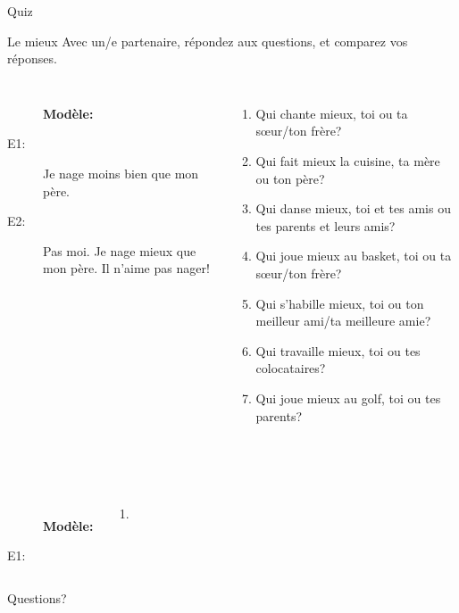 \documentclass{beamer}
\begin{document}
  \begin{frame}{}
    \begin{center}
      \Large Quiz
    \end{center}
  \end{frame}

  \begin{frame}{Le mieux}
    Avec un/e partenaire, répondez aux questions, et comparez vos réponses. \\
    \begin{columns}
        \begin{description}
          \item[] \textbf{Modèle:}
          \item[] 
          \item[E1:] Je nage moins bien que mon père.
          \item[E2:] Pas moi. Je nage mieux que mon père. Il n'aime pas nager!
        \end{description}
        \begin{enumerate}
          \item Qui chante mieux, toi ou ta sœur/ton frère?
          \item Qui fait mieux la cuisine, ta mère ou ton père?
          \item Qui danse mieux, toi et tes amis ou tes parents et leurs amis?
          \item Qui joue mieux au basket, toi ou ta sœur/ton frère?
          \item Qui s'habille mieux, toi ou ton meilleur ami/ta meilleure amie?
          \item Qui travaille mieux, toi ou tes colocataires?
          \item Qui joue mieux au golf, toi ou tes parents?
        \end{enumerate}
    \end{columns}
  \end{frame}

  \begin{frame}{}
     \\
    \tinygloss{}
    \begin{columns}
        \begin{description}
          \item[] \textbf{Modèle:}
          \item[] 
          \item[E1:]
        \end{description}
        \begin{enumerate}
          \item
        \end{enumerate}
    \end{columns}
  \end{frame}

  \begin{frame}{}
    \begin{center}
      \Large Questions?
    \end{center}
  \end{frame}
\end{document}
